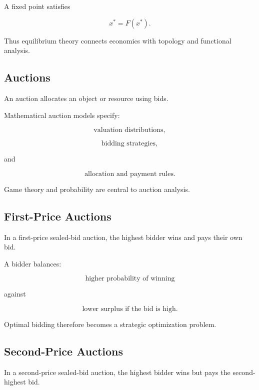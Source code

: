 A fixed point satisfies

\[
\boxed{
x^*
=
F(x^*).
}
\]

Thus equilibrium theory connects economics with topology and functional
analysis.

\subsection{Auctions}
\label{subsec:auction-models}

An auction allocates an object or resource using bids.

Mathematical auction models specify:

\[
\boxed{
\text{valuation distributions},
}
\]

\[
\boxed{
\text{bidding strategies},
}
\]

and

\[
\boxed{
\text{allocation and payment rules}.
}
\]

Game theory and probability are central to auction analysis.

\subsection{First-Price Auctions}
\label{subsec:first-price-auctions}

In a first-price sealed-bid auction, the highest bidder wins and pays their
own bid.

A bidder balances:

\[
\boxed{
\text{higher probability of winning}
}
\]

against

\[
\boxed{
\text{lower surplus if the bid is high}.
}
\]

Optimal bidding therefore becomes a strategic optimization problem.

\subsection{Second-Price Auctions}
\label{subsec:second-price-auctions}

In a second-price sealed-bid auction, the highest bidder wins but pays the
second-highest bid.

